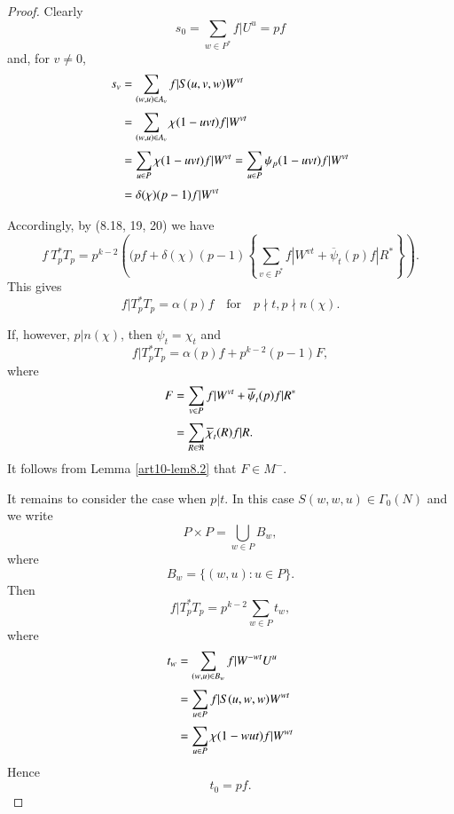 \begin{proof}
Clearly
\begin{equation}
s_{0}=\sum\limits_{w\in P^{*}}f|U^{u}=pf\label{art10-eq8.19}
\end{equation}
and, for $v\neq 0$,
\begin{align}
s_{v} &= \sum\limits_{(w,u)\in A_{v}}f|S(u,v,w)W^{vt}\notag\\[3pt]
 &= \sum\limits_{(w,u)\in A_{v}}\chi(1-uvt)f|W^{vt}\notag\\[3pt]
&= \sum\limits_{u\in P}\chi(1-uvt)f|W^{vt}=\sum\limits_{u\in P}\psi_{p}(1-uvt)f|W^{vt}\notag\\[3pt]
&= \delta(\chi)(p-1)f|W^{vt}\label{art10-eq8.20}
\end{align}

Accordingly, by (8.18, 19, 20) we have
\begin{equation}
f \ T^{*}_{p}T_{p}=p^{k-2}\left((pf+\delta(\chi)(p-1)\left\{\sum\limits_{v\in P^{*}}f|W^{vt}+\overline{\psi}_{t}(p)f|R^{*}\right\}\right).\label{art10-eq8.21}
\end{equation}
This gives
\begin{equation}
f|T^{*}_{p}T_{p}=\alpha(p)f\text{~~ for~~ } p\nmid t, p\nmid n(\chi).\label{art10-eq8.22}
\end{equation}

If, however, $p|n(\chi)$, then $\psi_{t}=\chi_{t}$ and
\begin{equation}
f|T^{*}_{p}T_{p}=\alpha(p)f+p^{k-2}(p-1)F,\label{art10-eq8.23}
\end{equation}
where
\begin{align}
F &= \sum\limits_{v\in P}f|W^{vt}+\overline{\psi}_{t}(p)f|R^{*}\notag\\[3pt]
  &= \sum\limits_{R\in \mathfrak{R}}\overline{\chi}_{t}(R)f|R.\label{art10-eq8.24}
\end{align}
It follows from Lemma \ref{art10-lem8.2} that $F\in M^{-}$.

It remains to consider the case when $p|t$. In this case $S(w,w,u)\in \Gamma_{0}(N)$ and we write
\begin{equation}
P\times P=\bigcup\limits_{w\in P}B_{w},\label{art10-8.25}
\end{equation}
where
\begin{equation}
B_{w}=\{(w,u):u\in P\}.\label{art10-eq8.26}
\end{equation}
Then\pageoriginale
\begin{equation}
f|T^{*}_{p}T_{p}=p^{k-2}\sum\limits_{w\in P}t_{w},\label{art10-eq8.27}
\end{equation}
where
\begin{align}
t_{w} &= \sum\limits_{(w,u)\in B_{w}}f|W^{-wt}U^{u}\notag\\[3pt]
     &= \sum\limits_{u\in P}f|S(u,w,w)W^{wt}\notag\\[3pt]
     &= \sum\limits_{u\in P}\chi(1-wut)f|W^{wt}\label{art10-eq8.28}
\end{align}
Hence
\begin{equation}
t_{0}=pf.\label{art10-eq8.29}
\end{equation}


\end{proof}
